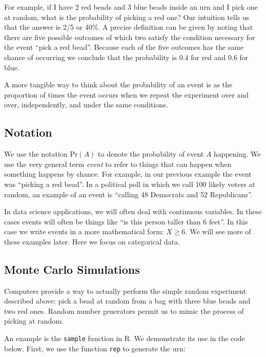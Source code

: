 \documentclass[
  openany]{book}
\begin{document}
For example, if I have 2 red beads and 3 blue beads inside an urn and I pick one at random, what is the probability of picking a red one? Our intuition tells us that the answer is 2/5 or 40\%. A precise definition can be given by noting that there are five possible outcomes of which two satisfy the condition necessary for the event ``pick a red bead''. Because each of the five outcomes has the same chance of occurring we conclude that the probability is 0.4 for red and 0.6 for blue.

A more tangible way to think about the probability of an event is as the proportion of times the event occurs when we repeat the experiment over and over, independently, and under the same conditions.

\hypertarget{notation}{%
\subsection{Notation}\label{notation}}

We use the notation \(\mbox{Pr}(A)\) to denote the probability of event \(A\) happening. We use the very general term \emph{event} to refer to things that can happen when something happens by chance. For example, in our previous example the event was ``picking a red bead''. In a political poll in which we call 100 likely voters at random, an example of an event is ``calling 48 Democrats and 52 Republicans''.

In data science applications, we will often deal with continuous variables. In these cases events will often be things like ``is this person taller than 6 feet''. In this case we write events in a more mathematical form: \(X \geq 6\). We will see more of these examples later. Here we focus on categorical data.

\hypertarget{monte-carlo-simulations}{%
\subsection{Monte Carlo Simulations}\label{monte-carlo-simulations}}

Computers provide a way to actually perform the simple random experiment described above: pick a bead at random from a bag with three blue beads and two red ones. Random number generators permit us to mimic the process of picking at random.

An example is the \texttt{sample} function in R. We demonstrate its use in the code below. First, we use the function \texttt{rep} to generate the urn:
\end{document}
